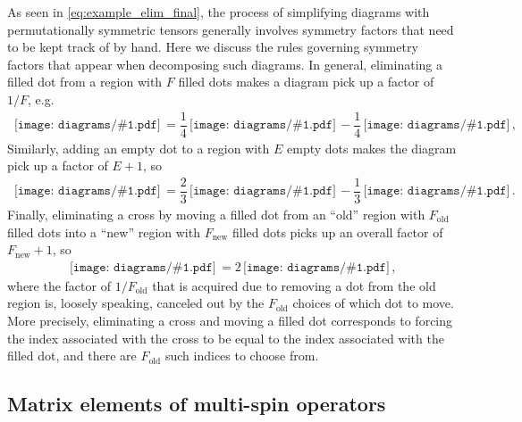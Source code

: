 \documentclass[nofootinbib,notitlepage,11pt]{revtex4-2}
\renewcommand{\t}{\text} %
\newcommand{\f}[2]{\dfrac{#1}{#2}} %
\newcommand{\1}{\mathds{1}}
\newcommand{\diagram}[1]
{\,\texttt{[image: diagrams/\#1.pdf]}\,}
\begin{document}
As seen in \eqref{eq:example_elim_final}, the process of simplifying
diagrams with permutationally symmetric tensors generally involves
symmetry factors that need to be kept track of by hand.  Here we
discuss the rules governing symmetry factors that appear when
decomposing such diagrams.  In general, eliminating a filled dot from
a region with $F$ filled dots makes a diagram pick up a factor of
$1/F$, e.g.
\begin{align}
  \diagram{example_sym}
  = \f14 \diagram{example_sym_o}
  - \f14 \diagram{example_sym_x},
\end{align}
Similarly, adding an empty dot to a region with $E$ empty dots makes
the diagram pick up a factor of $E+1$, so
\begin{align}
  \diagram{example_sym_o}
  = \f23 \diagram{example_sym_oo}
  - \f13 \diagram{example_sym_ox}.
\end{align}
Finally, eliminating a cross by moving a filled dot from an ``old''
region with $F_{\t{old}}$ filled dots into a ``new'' region with
$F_{\t{new}}$ filled dots picks up an overall factor of
$F_{\t{new}}+1$, so
\begin{align}
  \diagram{example_sym_x} = 2 \diagram{example_sym_x_elim},
\end{align}
where the factor of $1/F_{\t{old}}$ that is acquired due to removing a
dot from the old region is, loosely speaking, canceled out by the
$F_{\t{old}}$ choices of which dot to move.  More precisely,
eliminating a cross and moving a filled dot corresponds to forcing the
index associated with the cross to be equal to the index associated
with the filled dot, and there are $F_{\t{old}}$ such indices to
choose from.

\subsection{Matrix elements of multi-spin operators}
\end{document}
